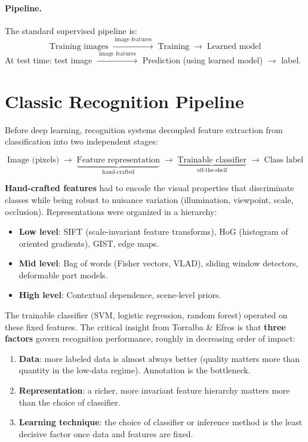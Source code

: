 \documentclass[11pt,a4paper]{article}
\theoremstyle{definition}
\theoremstyle{plain}
\theoremstyle{remark}
\begin{document}
\paragraph{Pipeline.} The standard supervised pipeline is:
\[
    \text{Training images} \;\xrightarrow{\;\text{image features}\;}\; \text{Training} \;\xrightarrow{}\; \text{Learned model}
\]
At test time: test image $\xrightarrow{\;\text{image features}\;}$ Prediction (using learned model) $\xrightarrow{}$ label.


\section{Classic Recognition Pipeline}

Before deep learning, recognition systems decoupled feature extraction from classification into two independent stages:

\[
    \text{Image (pixels)} \;\longrightarrow\; \underbrace{\text{Feature representation}}_{\text{hand-crafted}} \;\longrightarrow\; \underbrace{\text{Trainable classifier}}_{\text{off-the-shelf}} \;\longrightarrow\; \text{Class label}
\]

\textbf{Hand-crafted features} had to encode the visual properties that discriminate classes while being robust to nuisance variation (illumination, viewpoint, scale, occlusion).
Representations were organized in a hierarchy:

\begin{itemize}
    \item \textbf{Low level}: SIFT (scale-invariant feature transforms), HoG (histogram of oriented gradients), GIST, edge maps.
    \item \textbf{Mid level}: Bag of words (Fisher vectors, VLAD), sliding window detectors, deformable part models.
    \item \textbf{High level}: Contextual dependence, scene-level priors.
\end{itemize}

The trainable classifier (SVM, logistic regression, random forest) operated on these fixed features.
The critical insight from Torralba \& Efros is that \textbf{three factors} govern recognition performance, roughly in decreasing order of impact:

\begin{enumerate}
    \item \textbf{Data}: more labeled data is almost always better (quality matters more than quantity in the low-data regime). Annotation is the bottleneck.
    \item \textbf{Representation}: a richer, more invariant feature hierarchy matters more than the choice of classifier.
    \item \textbf{Learning technique}: the choice of classifier or inference method is the least decisive factor once data and features are fixed.
\end{enumerate}
\end{document}
